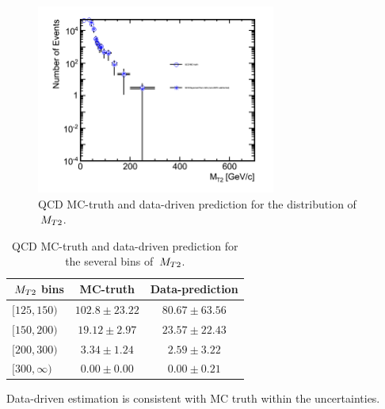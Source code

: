 \begin{linenomath}
\begin{figure}
\centering
\includegraphics[width=0.7\textwidth,keepaspectratio=true]{QCDFig/exp_distribution.png}
\caption{QCD MC-truth and data-driven prediction for the distribution of $\,{M_{T2}}$.}
\label{fig:exp_distribution}
\end{figure}
\end{linenomath}

\begin{linenomath}
\begin{table}[h]
\begin{center}
\small
\begin{tabular}{l|cc}\hline\hline
$\,{M_{T2}}$ bins & MC-truth & Data-prediction \\ \hline
$[125, 150)$	&	$102.8\pm23.22$		& $80.67\pm63.56$ \\
$[150, 200)$	&	$19.12\pm2.97$		& $23.57\pm22.43$ \\
$[200, 300)$	&	$3.34\pm1.24$		& $2.59\pm3.22$ \\
$[300, \infty)$	&	$0.00\pm0.00$	& $0.00\pm0.21$ \\ \hline\hline



\end{tabular}
\caption{QCD MC-truth and data-driven prediction for the several bins of $\,{M_{T2}}$.}
\label{tab:exp_distribution}
\end{center}
\end{table}
\end{linenomath}
Data-driven estimation is consistent with MC truth within the uncertainties.






